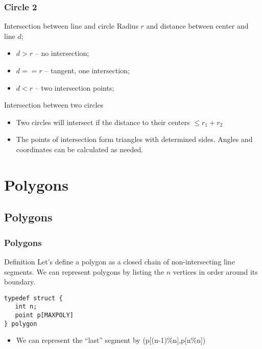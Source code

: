 \documentclass{beamer}
\begin{document}
\begin{frame}
  \frametitle{Circle 2}
  \begin{block}{Intersection between line and circle}
    Radius $r$ and distance between center and line $d$;
    \begin{itemize}
    \item $d > r$ -- no intersection;
    \item $d == r$ -- tangent, one intersection;
    \item $d < r$ -- two intersection points;
    \end{itemize}
  \end{block}
  \begin{block}{Intersection between two circles}
  \begin{itemize}
    \medskip
  \item Two circles will intersect if the distance to their centers $\leq r_1+r_2$
  \item The points of intersection form triangles with determined
    sides. Angles and coordinates can be calculated as needed.
  \end{itemize}
  \end{block}
\end{frame}

\section{Polygons}

\subsection{Polygons}

\begin{frame}
  \frametitle{Polygons}
  \begin{block}{Definition}
    Let's define a polygon as a closed chain of non-intersecting line
    segments. We can represent polygons by listing the $n$ vertices in
    order around its boundary.
  \end{block}
  \bigskip

\begin{verbatim}
typedef struct {
   int n;
   point p[MAXPOLY]
} polygon
\end{verbatim}

\begin{itemize}
\item We can represent the ``last'' segment by (p[(n-1)\%n],p[n\%n])
\end{itemize}
\end{frame}
\end{document}
